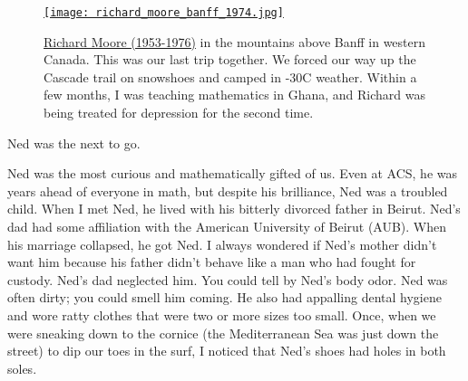 \captionsetup[figure]{labelformat=empty}
\begin{SCfigure}
\centering
\href{https://conceptcontrol.smugmug.com/People/Inlaws-Outlaws-and-Friends/i-dNPP9pn/A}{\texttt{[image: richard\_moore\_banff\_1974.jpg]}}
\caption[Richard Moore (1953-1976)]{\href{https://www.findagrave.com/memorial/162651768/richard_william-moore}{Richard
Moore (1953-1976)} in the mountains above Banff in western Canada. This
was our last trip together. We forced our way up the Cascade trail on
snowshoes and camped in -30C weather. Within a few months, I was
teaching mathematics in Ghana, and Richard was being treated for
depression for the second time.}
\label{fig:8196x1}
\end{SCfigure}

Ned was the next to go.

Ned was the most curious and mathematically gifted of us. Even at ACS,
he was years ahead of everyone in math, but despite his brilliance, Ned
was a troubled child. When I met Ned, he lived with his bitterly
divorced father in Beirut. Ned's dad had some affiliation with the
American University of Beirut (AUB). When his marriage collapsed, he got
Ned. I always wondered if Ned's mother didn't want him because his
father didn't behave like a man who had fought for custody. Ned's dad
neglected him. You could tell by Ned's body odor. Ned was often dirty;
you could smell him coming. He also had appalling dental hygiene and
wore ratty clothes that were two or more sizes too small. Once, when we
were sneaking down to the cornice (the Mediterranean Sea was just down
the street) to dip our toes in the surf, I noticed that Ned's shoes had
holes in both soles.

